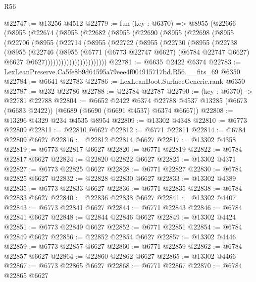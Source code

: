 \begin{lexlean}{R56}
\begin{coremodule}
@22747 := @13256 @4512
@22779 := fun (key : @6370) =>
  @8955
    (@22666
      (@8955
        (@22674
          (@8955
            (@22682
              (@8955
                (@22690
                  (@8955
                    (@22698
                      (@8955
                        (@22706
                          (@8955
                            (@22714
                              (@8955
                                (@22722
                                  (@8955
                                    (@22730
                                      (@8955
                                        (@22738
                                          (@8955
                                            (@22746
                                              (@8955
                                                (@6771
                                                  (@6773 @22747 @6627)
                                                  (@6784 @22747 @6627)
                                                  @6627
                                                  @6627)))))))))))))))))))))))
@22781 := @6635 @2422 @6374
@22783 := LexLeanPreserve.Ca5fe8b9d64595a79eee4f004915717bd.R56.__fits_69 @6350
@22784 := @6641 @22783
@22786 := LexLeanBoot.SurfaceGeneric.rank @6350
@22787 := @232 @22786
@22788 := @22784 @22787
@22790 := (key : @6370) -> @22781 @22788
@22804 := @6652
    @2422
    @6374
    @22788
    @4537
    @13285
    (@6673 (@6683 @2422))
    (@6689 (@6690 (@6691 @4537) @6374 @6667))
@22808 := @13296 @4329 @234 @4535 @8954
@22809 := @13302 @4348
@22810 := @6773 @22809
@22811 := @22810 @6627
@22812 := @6771 @22811
@22814 := @6784 @22809 @6627
@22816 := @22812 @22814 @6627
@22817 := @13302 @4358
@22819 := @6773 @22817 @6627
@22820 := @6771 @22819
@22822 := @6784 @22817 @6627
@22824 := @22820 @22822 @6627
@22825 := @13302 @4371
@22827 := @6773 @22825 @6627
@22828 := @6771 @22827
@22830 := @6784 @22825 @6627
@22832 := @22828 @22830 @6627
@22833 := @13302 @4389
@22835 := @6773 @22833 @6627
@22836 := @6771 @22835
@22838 := @6784 @22833 @6627
@22840 := @22836 @22838 @6627
@22841 := @13302 @4407
@22843 := @6773 @22841 @6627
@22844 := @6771 @22843
@22846 := @6784 @22841 @6627
@22848 := @22844 @22846 @6627
@22849 := @13302 @4424
@22851 := @6773 @22849 @6627
@22852 := @6771 @22851
@22854 := @6784 @22849 @6627
@22856 := @22852 @22854 @6627
@22857 := @13302 @4446
@22859 := @6773 @22857 @6627
@22860 := @6771 @22859
@22862 := @6784 @22857 @6627
@22864 := @22860 @22862 @6627
@22865 := @13302 @4466
@22867 := @6773 @22865 @6627
@22868 := @6771 @22867
@22870 := @6784 @22865 @6627

\end{coremodule}
\end{lexlean}
